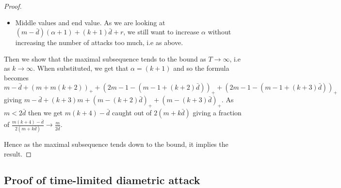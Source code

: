 \documentclass[a4paper,10pt]{article}
\newcommand{\pospart}[1]{\left( #1 \right)_{+}}
\theoremstyle{definition}
\theoremstyle{definition}
\theoremstyle{remark}
\theoremstyle{definition}
\begin{document}
\begin{proof}
\begin{itemize}
\item Middle values and end value. As we are looking at $(m-\bar{d})(\alpha+1)+(k+1)\bar{d}+r$, we still want to increase $\alpha$ without increasing the number of attacks too much, i.e as above.
\end{itemize}

Then we show that the maximal subsequence tends to the bound as $T \rightarrow \infty$, i.e as $k \rightarrow \infty$.
When substituted, we get that
$\alpha=(k+1)$ and so the formula becomes
$m-\bar{d}+\pospart{m + m(k+2)} + \pospart{2m-1-(m-1+(k+2)\bar{d})}+\pospart{2m-1-(m-1+(k+3)\bar{d})}$
giving $m-\bar{d}+(k+3)m + \pospart{m-(k+2)\bar{d}}+\pospart{m-(k+3)\bar{d}}$.
As $m < 2\bar{d}$ then we get $m(k+4) -\bar{d}$ caught out of $2(m+k\bar{d})$
giving a fraction of $\frac{m(k+4)-\bar{d}}{2(m+k\bar{d})} \rightarrow \frac{m}{2\bar{d}}$.

Hence as the maximal subsequence tends down to the bound, it implies the result.
\end{proof}

\subsection{Proof of time-limited diametric attack}
\label{Appendix:Proof of time-limited diametric attack}
\end{document}
